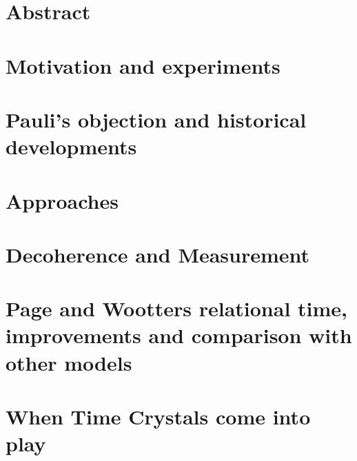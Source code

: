 




\maketitle

\tableofcontents

\chapter*{Abstract}


\iftodo
\chapter{Motivation and experiments}

\fi

\chapter{Pauli's objection and historical developments}


\iftodo
\chapter{Approaches}

\fi

\chapter{Decoherence and Measurement}









\chapter{Page and Wootters relational time, improvements and comparison with other models}



\iftodo
\chapter{When Time Crystals come into play}

\fi

